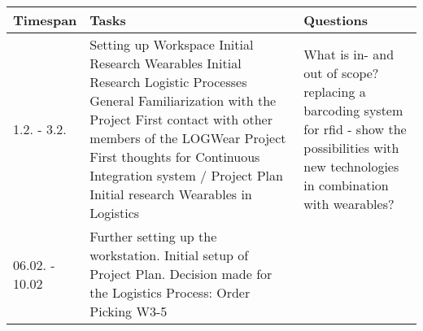 \documentclass{article}
\begin{document}
\begin{table}[htbp]
	\begin{center}
		\begin{tabular}{|p{0.15\linewidth}|p{0.55\linewidth}|p{0.3\linewidth}|} \hline
			\textbf{Timespan} & \textbf{Tasks} & \textbf{Questions} \\ \hline
            1.2. - 3.2. & 	Setting up Workspace \newline 
            				Initial Research Wearables \newline
            				Initial Research Logistic Processes \newline
            				General Familiarization with the Project \newline 
            				First contact with other members of the LOGWear Project \newline
            				First thoughts for Continuous Integration system / Project Plan \newline
            				Initial research Wearables in Logistics &
            				What is in- and out of scope? \newline
            				replacing a barcoding system for rfid - show the possibilities with new technologies in combination with wearables? \\ \hline
            				06.02. - 10.02 & Further setting up the workstation. \newline
            				Initial setup of Project Plan. \newline
            				Decision made for the Logistics Process: Order Picking W3-5 & \\ \hline
		\end{tabular}	
    \end{center}
\end{table}
\end{document}
